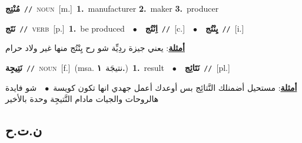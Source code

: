 \documentclass[10pt,a4paper,twoside]{article} %
\begin{document}
\begin{multicols}{2}
{\setlength\topsep{0pt}\textbf{\foreignlanguage{arabic}{مُنْتِج}}\ {\color{gray}\texttt{//}\color{black}}\ \textsc{noun}\ [m.]\ \textbf{1.}~manufacturer  \textbf{2.}~maker  \textbf{3.}~producer\ } \vspace{2mm}

{\setlength\topsep{0pt}\textbf{\foreignlanguage{arabic}{نَتَج}}\ {\color{gray}\texttt{//}\color{black}}\ \textsc{verb}\ [p.]\ \textbf{1.}~be produced\ \ $\bullet$\ \ \setlength\topsep{0pt}\textbf{\foreignlanguage{arabic}{اِنْتُج}}\ {\color{gray}\texttt{//}\color{black}}\ [c.]\ \ $\bullet$\ \ \setlength\topsep{0pt}\textbf{\foreignlanguage{arabic}{يِنْتُج}}\ {\color{gray}\texttt{//}\color{black}}\ [i.]\  \begin{flushright}\color{gray}\foreignlanguage{arabic}{\textbf{\underline{\foreignlanguage{arabic}{أمثلة}}}: يعني جيزة ردِيِّة شو رح يِنْتُج منها غير ولاد حرام}\end{flushright}\color{black}} \vspace{2mm}

{\setlength\topsep{0pt}\textbf{\foreignlanguage{arabic}{نَتِيجِة}}\ {\color{gray}\texttt{//}\color{black}}\ \textsc{noun}\ [f.]\ \color{gray}(msa. \foreignlanguage{arabic}{نتيجَة}~\foreignlanguage{arabic}{\textbf{١.}})\color{black}\ \textbf{1.}~result\ \ $\bullet$\ \ \setlength\topsep{0pt}\textbf{\foreignlanguage{arabic}{نَتَائِج}}\ {\color{gray}\texttt{//}\color{black}}\ [pl.]\  \begin{flushright}\color{gray}\foreignlanguage{arabic}{\textbf{\underline{\foreignlanguage{arabic}{أمثلة}}}: مستحيل أضمنلك النَّتائِج بس أوعدك أعمل جهدي انها تكون كويسة\ $\bullet$\ \  شو فايدة هالروحات والجيات مادام النَّتيجِة وحدة بالأخير}\end{flushright}\color{black}} \vspace{2mm}

\vspace{-3mm}
\subsection*{\color{blue}\foreignlanguage{arabic}{ن.ت.ح}\color{blue}{}} 


\end{multicols}
\end{document}
